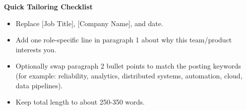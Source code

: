 \documentclass[11pt]{article}
\begin{document}
\textbf{Quick Tailoring Checklist}
\begin{itemize}[leftmargin=1.2em]
\item Replace [Job Title], [Company Name], and date.
\item Add one role-specific line in paragraph 1 about why this team/product interests you.
\item Optionally swap paragraph 2 bullet points to match the posting keywords (for example: reliability, analytics, distributed systems, automation, cloud, data pipelines).
\item Keep total length to about 250-350 words.
\end{itemize}
\end{document}
